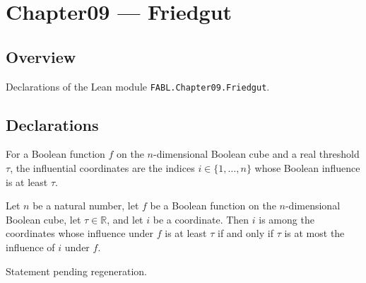 \chapter{Chapter09 — Friedgut}
\section{Overview}

Declarations of the Lean module \texttt{FABL.Chapter09.Friedgut}.

\section{Declarations}

\begin{definition}
\label{FABL.influentialCoordinates}
\leanok
{}
For a Boolean function $f$ on the $n$-dimensional Boolean cube and a real threshold
$\tau$, the influential coordinates are the indices $i\in\{1,\ldots,n\}$ whose Boolean
influence is at least $\tau$.
\end{definition}

\begin{theorem}
\label{FABL.mem_influentialCoordinates}
\leanok
{}
Let $n$ be a natural number, let $f$ be a Boolean function on the $n$-dimensional
Boolean cube, let $\tau\in\mathbb{R}$, and let $i$ be a coordinate. Then $i$ is among
the coordinates whose influence under $f$ is at least $\tau$ if and only if $\tau$ is
at most the influence of $i$ under $f$.
\end{theorem}

\begin{theorem}
\label{FABL.not_mem_influentialCoordinates}
\leanok
{}
Statement pending regeneration.
\end{theorem}

